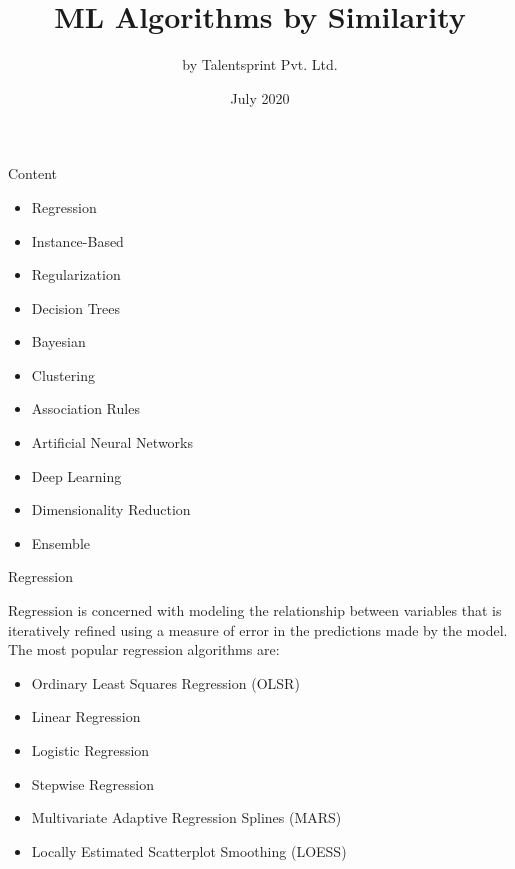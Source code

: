 \documentclass{beamer}
\title{ML Algorithms by Similarity}
\author{by Talentsprint Pvt. Ltd.}
\date{July 2020}
\begin{document}
\maketitle
\begin{frame}{Content}
	\begin{itemize}
		\item Regression
		\item Instance-Based
		\item Regularization
		\item Decision Trees
		\item Bayesian
		\item Clustering
		\item Association Rules
		\item Artificial Neural Networks
		\item Deep Learning
		\item Dimensionality Reduction
		\item Ensemble
	\end{itemize}
\end{frame}

\begin{frame}{Regression}
\begin{flushleft}
	Regression is concerned with modeling the relationship between variables that is iteratively refined using a measure of error in the predictions made by the model. 
\\
\vspace{10pt}
	The most popular regression algorithms are:
\begin{itemize}
	\item Ordinary Least Squares Regression (OLSR)
	\item Linear Regression
	\item Logistic Regression
	\item Stepwise Regression
	\item Multivariate Adaptive Regression Splines (MARS)
	\item Locally Estimated Scatterplot Smoothing (LOESS)
\end{itemize}
\end{flushleft}
\end{frame}
\end{document}
